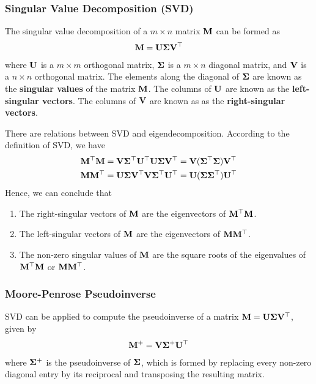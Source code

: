 \subsubsection*{Singular Value Decomposition (SVD)}

The singular value decomposition of a $m\times n$ matrix $\mathbf{M}$ can be formed as
\begin{align*}
	\mathbf{M}=\mathbf{U}\mathbf{\Sigma}\mathbf{V}{}^\top
\end{align*}
where $\mathbf{U}$ is a $m\times m$ orthogonal matrix, $\mathbf{\Sigma}$ is a $m\times n$ diagonal matrix, and $\mathbf{V}$ is a $n\times n$ orthogonal matrix. The elements along the diagonal of $\mathbf{\Sigma}$ are known as the {\bf singular values} of the matrix $\mathbf{M}$. The columns of $\mathbf{U}$ are known as the {\bf left-singular vectors}. The columns of $\mathbf{V}$ are known as as the {\bf right-singular vectors}.

There are relations between SVD and eigendecomposition. According to the definition of SVD, we have
\begin{align*}
	\mathbf{M}{}^\top\mathbf{M}&=\mathbf{V}\mathbf{\Sigma}{}^\top\mathbf{U}{}^\top\mathbf{U}\mathbf{\Sigma}\mathbf{V}{}^\top=\mathbf{V}(\mathbf{\Sigma}{}^\top\mathbf{\Sigma})\mathbf{V}{}^\top \\
	\mathbf{M}\mathbf{M}{}^\top&=\mathbf{U}\mathbf{\Sigma}\mathbf{V}{}^\top\mathbf{V}\mathbf{\Sigma}{}^\top\mathbf{U}{}^\top=\mathbf{U}(\mathbf{\Sigma}\mathbf{\Sigma}{}^\top)\mathbf{U}{}^\top
\end{align*}
Hence, we can conclude that
\begin{enumerate}
	\item The right-singular vectors of $\mathbf{M}$ are the eigenvectors of $\mathbf{M}{}^\top\mathbf{M}$.
	\item The left-singular vectors of $\mathbf{M}$ are the eigenvectors of $\mathbf{M}\mathbf{M}{}^\top$.
	\item The non-zero singular values of $\mathbf{M}$ are the square roots of the eigenvalues of $\mathbf{M}{}^\top\mathbf{M}$ or $\mathbf{M}\mathbf{M}{}^\top$.
\end{enumerate}

\subsubsection*{Moore-Penrose Pseudoinverse}

SVD can be applied to compute the pseudoinverse of a matrix $\mathbf{M}=\mathbf{U}\mathbf{\Sigma}\mathbf{V}{}^\top$, given by
\begin{align*}
	\mathbf{M}^+=\mathbf{V}\mathbf{\Sigma}^+\mathbf{U}{}^\top
\end{align*}
where $\mathbf{\Sigma}^+$ is the pseudoinverse of $\mathbf{\Sigma}$, which is formed by replacing every non-zero diagonal entry by its reciprocal and transposing the resulting matrix.

